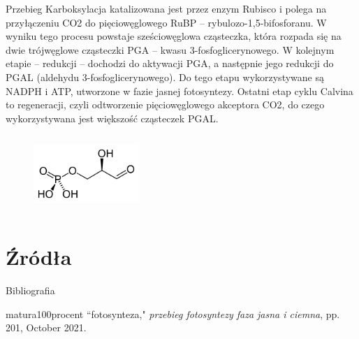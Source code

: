 \documentclass{beamer}
\begin{document}
\begin{frame}{Przebieg}
Karboksylacja katalizowana jest przez enzym Rubisco i polega na przyłączeniu CO2 do pięciowęglowego RuBP – rybulozo-1,5-bifosforanu. W wyniku tego procesu powstaje sześciowęglowa cząsteczka, która rozpada się na dwie trójwęglowe cząsteczki PGA – kwasu 3-fosfoglicerynowego. W kolejnym etapie – redukcji – dochodzi do aktywacji PGA, a następnie jego redukcji do PGAL (aldehydu 3-fosfoglicerynowego). Do tego etapu wykorzystywane są NADPH i ATP, utworzone w fazie jasnej fotosyntezy. Ostatni etap cyklu Calvina to regeneracji, czyli odtworzenie pięciowęglowego akceptora CO2, do czego wykorzystywana jest większość cząsteczek PGAL.
	\begin{columns}
		\begin{figure}
			\hspace*{-3cm}
			\includegraphics[width=4cm]{pgal.png}
		\end{figure}
		

	\end{columns}
\end{frame}

\section{Źródła}
\begin{frame}{Bibliografia}
\begin{thebibliography}{10}
	matura100procent ``fotosynteza," \emph{przebieg fotosyntezy faza jasna i ciemna}, pp. 201, October 2021.
\end{thebibliography}
\end{frame}
\end{document}
